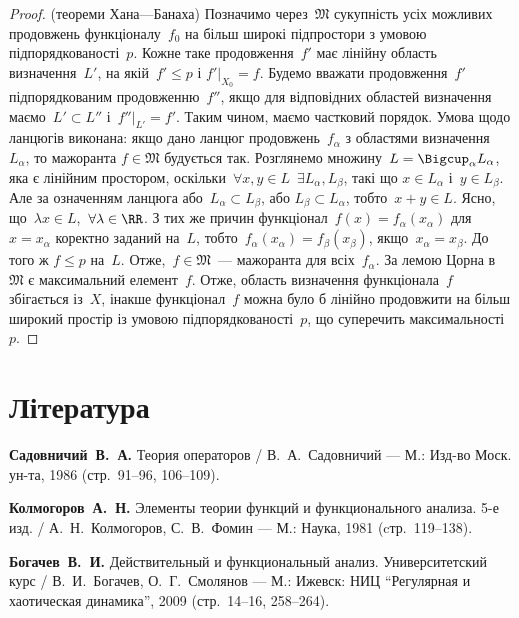 \begin{proof}(теореми Хана---Банаха)
Позначимо через~$\mathfrak{M}$ сукупність усіх можливих
продовжень функціоналу~$f_0$ на більш широкі підпростори з
умовою підпорядкованості~$p$. Кожне таке продовження~$f'$
має лінійну область визначення~$L'$, на якій~$f' \le p$ і
$f'|_{X_0} = f$. Будемо вважати продовження~$f'$ підпорядкованим
продовженню~$f''$, якщо для відповідних областей визначення
маємо~$L' \subset L''$ і~$f''|_{L'} = f'$. Таким чином, маємо частковий
порядок. Умова щодо ланцюгів виконана: якщо дано ланцюг
продовжень~$f_\alpha$ з областями визначення~$L_\alpha$, то мажоранта
$f \in \mathfrak{M}$ будується так.
Розглянемо множину~$L = \Bigcup_\alpha L_\alpha$, яка є
лінійним простором, оскільки~$\forall x, y \in L$~$\exists L_\alpha, L_\beta$, такі що
$x \in L_\alpha$ і~$y \in L_\beta$.
Але за означенням ланцюга або~$L_\alpha \subset L_\beta$, або
$L_\beta \subset L_\alpha$, тобто~$x + y \in L$.
Ясно, що~$\lambda x \in L$,~$\forall \lambda \in \RR$. З тих же
причин функціонал~$f(x) = f_\alpha(x_\alpha)$ для~$x = x_\alpha$ коректно
заданий на~$L$, тобто~$f_\alpha(x_\alpha) = f_\beta(x_\beta)$,
якщо~$x_\alpha = x_\beta$. До того ж
$f \le p$ на~$L$. Отже,~$f \in \mathfrak{M}$~--- мажоранта для всіх~$f_\alpha$. За
лемою Цорна в~$\mathfrak{M}$ є максимальний елемент~$f$. Отже,
область визначення функціонала~$f$ збігається із~$X$, інакше
функціонал~$f$ можна було б лінійно продовжити на більш
широкий простір із умовою підпорядкованості~$p$, що
суперечить максимальності~$p$.
\end{proof}


\section{Література}

\begin{enumerate}[label={[\arabic*]}]
\item \textbf{Садовничий~В.~А.}
Теория операторов /
В.~А.~Садовничий ---
М.: Изд-во Моск. ун-та, 1986 (стр.~91--96, 106--109).
\item \textbf{Колмогоров~А.~Н.}
Элементы теории функций и функционального анализа. 5-е изд. /
А.~Н.~Колмогоров, С.~В.~Фомин ---
М.: Наука, 1981 (cтр.~119--138).
\item \textbf{Богачев~В.~И.}
Действительный и функциональный анализ. Университетский курс /
В.~И.~Богачев, О.~Г.~Смолянов ---
М.: Ижевск: НИЦ ``Регулярная и хаотическая динамика'', 2009 (стр.~14--16, 258--264).
\end{enumerate}
